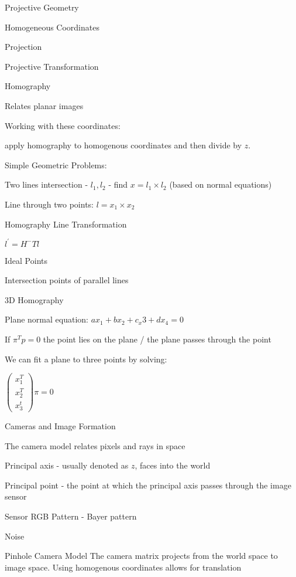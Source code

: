 \begin{section}
\begin{subsubsection}
\begin{subsubsection}
\begin{subsubsection}
\begin{section}{Projective Geometry}
\begin{subsection}{Homogeneous Coordinates}
\begin{subsubsection}
{\begin{subsubsection}{Projection}
\begin{subsubsection}{Projective Transformation}
\begin{subsection}
\begin{subsubsection} Homography

Relates planar images

Working with these coordinates:

apply homography to homogenous coordinates and then divide by $z$.

Simple Geometric Problems:

Two lines intersection - $l_1,l_2$ - find $x = l_1 \times l_2$  (based on normal equations)

Line through two points: $l = x_1 \times x_2 $

\begin{subsubsection} Homography Line Transformation

$l^\prime = H^-T l$

\begin{subsubsection}{ Ideal Points

Intersection points of parallel lines

\begin{subsubsection} 3D Homography

Plane normal equation: $ax_1 + bx_2 + c_x3 + d x_4 = 0$ 

If $\pi^T p = 0$ the point lies on the plane / the plane passes through the point

We can fit a plane to three points by solving: 

$\left( \begin{matrix} x_1^T \\ x_2^T \\ x_3^t \end{matrix} \right) \pi = 0 $



\begin{subsection} Cameras and Image Formation

The camera model relates pixels and rays in space

Principal axis - usually denoted as $z$, faces into the world

Principal point - the point at which the principal axis passes through the image sensor

Sensor RGB Pattern - Bayer pattern

Noise

\begin{subsection} {Pinhole Camera Model}
The camera matrix projects from the world space to image space. Using homogenous coordinates allows for translation


\end{subsection}
\end{subsection}
\end{subsubsection}}
\end{subsubsection}
\end{subsubsection}
\end{subsubsection}
\end{subsection}
\end{subsubsection}
\end{subsubsection}}
\end{subsubsection}
\end{subsection}
\end{section}
\end{subsubsection}
\end{subsubsection}
\end{subsubsection}
\end{section}
